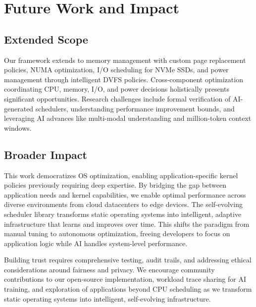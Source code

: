 \section{Future Work and Impact}

\subsection{Extended Scope}

Our framework extends to memory management with custom page replacement policies, NUMA optimization, I/O scheduling for NVMe SSDs, and power management through intelligent DVFS policies. Cross-component optimization coordinating CPU, memory, I/O, and power decisions holistically presents significant opportunities. Research challenges include formal verification of AI-generated schedulers, understanding performance improvement bounds, and leveraging AI advances like multi-modal understanding and million-token context windows.

\subsection{Broader Impact}

This work democratizes OS optimization, enabling application-specific kernel policies previously requiring deep expertise. By bridging the gap between application needs and kernel capabilities, we enable optimal performance across diverse environments from cloud datacenters to edge devices. The self-evolving scheduler library transforms static operating systems into intelligent, adaptive infrastructure that learns and improves over time. This shifts the paradigm from manual tuning to autonomous optimization, freeing developers to focus on application logic while AI handles system-level performance.

Building trust requires comprehensive testing, audit trails, and addressing ethical considerations around fairness and privacy. We encourage community contributions to our open-source implementation, workload trace sharing for AI training, and exploration of applications beyond CPU scheduling as we transform static operating systems into intelligent, self-evolving infrastructure.